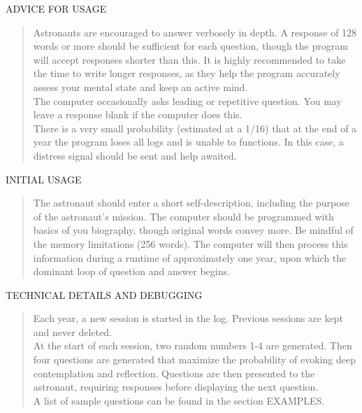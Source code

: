 \documentclass{article}
\begin{document}
ADVICE FOR USAGE
\begin{quote}
  Astronauts are encouraged to answer verbosely in depth. A response of 128 words or more should be sufficient for each question, though the program will accept responses shorter than this. It is highly recommended to take the time to write longer responses, as they help the program accurately assess your mental state and keep an active mind. \\

  The computer occasionally asks leading or repetitive question. You may leave a response blank if the computer does this. \\

  There is a very small probability (estimated at a 1/16) that at the end of a year the program loses all logs and is unable to functions. In this case, a distress signal should be sent and help awaited.
\end{quote}

INITIAL USAGE
\begin{quote}
  The astronaut should enter a short self-description, including the purpose of the astronaut's mission. The computer should be programmed with basics of you biography, though original words convey more. Be mindful of the memory limitations (256 words). The computer will then process this information during a runtime of approximately one year, upon which the dominant loop of question and answer begins. 
\end{quote}

TECHNICAL DETAILS AND DEBUGGING
\begin{quote}
  Each year, a new session is started in the log. Previous sessions are kept and never deleted. \\

  At the start of each session, two random numbers 1-4 are generated. Then four questions are generated that maximize the probability of evoking deep contemplation and reflection. Questions are then presented to the astronaut, requiring responses before displaying the next question. \\

  A list of sample questions can be found in the section EXAMPLES.
\end{quote}
\end{document}

